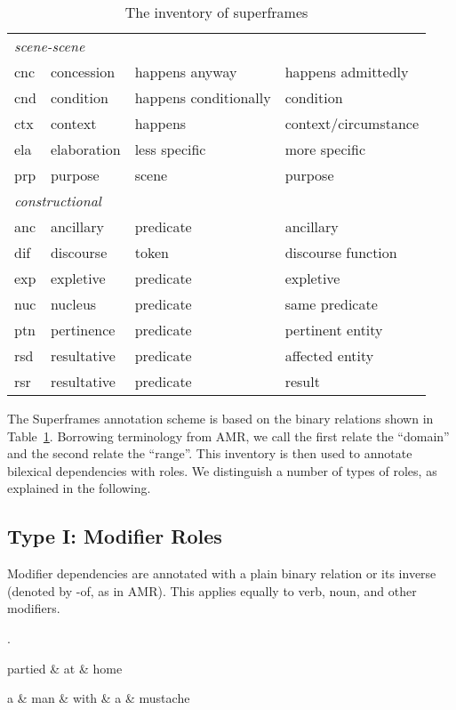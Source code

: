 \documentclass[a4paper]{article}
\begin{document}
\begin{table}
\begin{tabular}{llll}
        \multicolumn{4}{l}{\emph{scene-scene}} \\
        cnc & concession & happens anyway & happens admittedly \\
        cnd & condition & happens conditionally & condition \\
        ctx & context & happens & context/circumstance \\
        ela & elaboration & less specific & more specific \\
        prp & purpose & scene & purpose \\
        \midrule
        \multicolumn{4}{l}{\emph{constructional}} \\
        anc & ancillary & predicate & ancillary \\
        dif & discourse & token & discourse function \\
        exp & expletive & predicate & expletive \\
        nuc & nucleus & predicate & same predicate \\
        ptn & pertinence & predicate & pertinent entity \\
        rsd & resultative & predicate & affected entity \\
        rsr & resultative & predicate & result \\ 
        \bottomrule
    \end{tabular}
    \caption{The inventory of superframes}
    \label{tab:inventory}
\end{table}

The Superframes annotation scheme is based on the binary relations shown in Table~\ref{tab:inventory}. Borrowing terminology from AMR, we call the first relate the ``domain'' and the second relate the ``range''. This inventory is then used to annotate bilexical dependencies with roles. We distinguish a number of types of roles, as explained in the following.

\subsection{Type I: Modifier Roles}

Modifier dependencies are annotated with a plain binary relation or its inverse (denoted by \textsf{-of}, as in AMR). This applies equally to verb, noun, and other modifiers.

\ex.
\begin{dependency}
  \begin{deptext}
    partied \& at \& home \\
  \end{deptext}
\end{dependency}
\begin{dependency}
  \begin{deptext}
    a \& man \& with \& a \& mustache \\
  \end{deptext}
\end{dependency}
\end{document}
